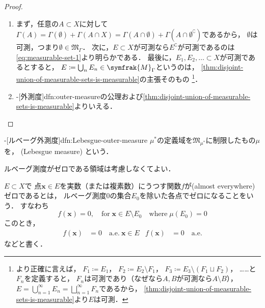 \documentclass[../sotsu.tex]{subfiles}
\begin{document}
\begin{proof}
    \begin{enumerate}
    \item まず，任意の$A \subset X$に対して$Γ(A) = Γ(\emptyset) + Γ(A \cap X) = Γ(A \cap \emptyset) + Γ(A \cap \emptyset^{\complement})$であるから，
        $\emptyset$は可測，つまり$\emptyset \in 𝔐_Γ$．
        次に，$E \subset X$が可測なら$E^{\complement}$が可測であるのは\cref{eq:measurable-set-1}より明らかである．
        最後に，$E_1, E_2, \dotsc \subset X$が可測であるとすると，
        $E \coloneq \bigcup_{n} E_n \in \symfrak{M}_{\Gamma}$というのは，
        \cref{thm:disjoint-union-of-measurable-sets-is-measurable}の主張そのもの%
        \footnote{
            より正確に言えば，
            $F_1 \coloneq E_1$，
            $F_2 \coloneq E_2 \setminus F_1$，
            $F_3 \coloneq E_3 \setminus (F_1 \sqcup F_2)$，
            ……と$F_n$を定義すると，
            $F_n$は可測であり（なぜなら$A, B$が可測なら$A \setminus B$），
            $E = \bigcup_{n=1}^{\infty} E_n = \bigsqcup_{n=1}^{\infty} F_n$であるから，
            \cref{thm:disjoint-union-of-measurable-sets-is-measurable}より$E$は可測．
        }．
    \item {}-[外測度]{dfn:outer-measure}の公理および\cref{thm:disjoint-union-of-measurable-sets-is-measurable}よりいえる．
    \end{enumerate}
\end{proof}



\begin{definition}
    \label{dfn:Lebesgue-measure}
    -[ルベーグ外測度]{dfn:Lebesgue-outer-measure}%
    $\mu^*$の定義域を$𝔐_{\mu^*}$に制限したもの$\mu$を，
    (Lebesgue measure)
    という．
\end{definition}


ルベーグ測度がゼロである領域は考慮しなくてよい．

\begin{definition}
    \label{dfn:almost-everywhere}
    $E \subset X$で
    点$\symbf{x} \in E$を実数（または複素数）にうつす関数$f$が(almost everywhere)ゼロであるとは，
    ルベーグ測度$0$の集合$E_0$を除いた各点でゼロになることをいう．
    すなわち
    \begin{equation*}
        f(\symbf{x}) = 0  ,
        \quad  \text{for}   \; \symbf{x} \in E \setminus E_0  
        \quad  \text{where} \; \mu(E_0) = 0
    \end{equation*}
    このとき，
    \begin{align*}
        f(\symbf{x}) &= 0  \quad  \text{a.e.} \  \symbf{x} \in E
        &
        f(\symbf{x}) &= 0  \quad  \text{a.e.}
    \end{align*}
    などと書く．
\end{definition}
\end{document}

